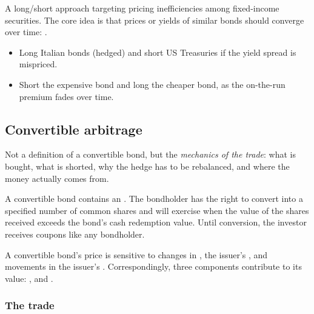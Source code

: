 A long/short approach targeting pricing inefficiencies among fixed-income
securities. The core idea is that prices or yields of similar bonds should
converge over time: .

\begin{itemize}
\item Long Italian bonds (hedged) and short US Treasuries if the yield spread is
mispriced.
\item Short the expensive  bond and long the cheaper
 bond, as the on-the-run premium fades over time.
\end{itemize}

\subsection{Convertible arbitrage}

\gapbadge
{}

\begin{imgapbox}[title={What the objective asks for}]
Not a definition of a convertible bond, but the \emph{mechanics of the trade}:
what is bought, what is shorted, why the hedge has to be rebalanced, and where
the money actually comes from.
\end{imgapbox}

A convertible bond contains an . The bondholder
has the right to convert into a specified number of common shares and will
exercise when the value of the shares received exceeds the bond's cash redemption
value. Until conversion, the investor receives coupons like any bondholder.

\begin{imkeybox}[title={Three sensitivities, three value components}]
A convertible bond's price is sensitive to changes in , the
issuer's , and movements in the issuer's . Correspondingly, three components contribute to its value:
,  and .
\end{imkeybox}

\subsubsection*{The trade}

